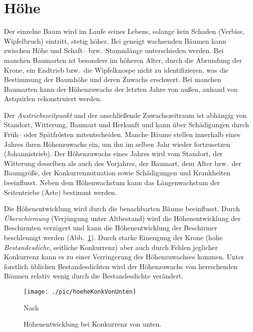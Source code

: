 \documentclass[twocolumn]{scrartcl}
\begin{document}
\section{Höhe}

Der einzelne Baum wird im Laufe seines Lebens, solange kein Schaden (Verbiss,
Wipfelbruch) eintritt, stetig höher. Bei geneigt wachsenden Bäumen kann zwischen
Höhe und Schaft-- bzw.\ Stammlänge unterschieden werden. Bei manchen Baumarten
ist besonders im höheren Alter, durch die Abrundung der Krone, ein Endtrieb
bzw.\ die Wipfelknospe nicht zu identifizieren, was die Bestimmung der Baumhöhe
und deren Zuwachs erschwert. Bei manchen Baumarten kann der Höhenzuwachs der
letzten Jahre von außen, anhand von Astquirlen rekonstruiert werden.

Der \emph{Austriebszeitpunkt} und der anschließende Zuwachszeitraum ist abhängig
von Standort, Witterung, Baumart und Herkunft und kann über Schädigungen durch
Früh-- oder Spätfrösten mitentscheiden. Manche Bäume stellen innerhalb eines
Jahres ihren Höhenzuwachs ein, um ihn im selben Jahr wieder fortzusetzen
(Johannistrieb). Der Höhenzuwachs eines Jahres wird vom Standort, der Witterung
desselben als auch des Vorjahres, der Baumart, dem Alter bzw.\ der Baumgröße,
der Konkurrenzsituation sowie Schädigungen und Krankheiten beeinflusst. Neben
dem Höhenwachstum kann das Längenwachstum der Seitentriebe (Äste) bestimmt
werden.

Die Höhenentwicklung wird durch die benachbarten Bäume beeinflusst. Durch
\emph{Überschirmung} (Verjüngung unter Altbestand) wird die Höhenentwicklung der
Beschirmten verzögert und kann die Höhenentwicklung der Beschirmer beschleunigt
werden (Abb.~\ref{fig:hoeheKonkVonUnten}). Durch starke Einengung der Krone
(hohe \emph{Bestandesdiche}, seitliche Konkurrenz) aber auch durch Fehlen
jeglicher Konkurrenz kann es zu einer Verringerung des Höhenzuwachses kommen.
Unter forstlich üblichen Bestandesdichten wird der Höhenzuwachs von herrschenden
Bäumen relativ wenig durch die Bestandesdichte verändert.

\begin{figure}[htbp]
  \centering
  \texttt{[image: ./pic/hoeheKonkVonUnten]}
  \caption{Höhenentwicklung bei Konkurrenz von unten.}
  \footnotesize{Nach \cite{zundel1960ErtragskundlicheUntersuchungenInZweialtrigenBestaendenNordwuerttembergs}}
  \label{fig:hoeheKonkVonUnten}
\end{figure}
\end{document}
